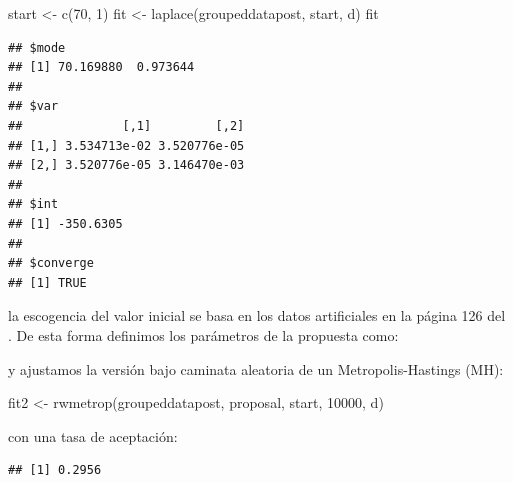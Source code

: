 \documentclass[
  12pt,
]{book}
\newenvironment{Shaded}{\begin{snugshade}}{\end{snugshade}}
\newcommand{\AttributeTok}[1]{\textcolor[rgb]{0.77,0.63,0.00}{#1}}
\newcommand{\DecValTok}[1]{\textcolor[rgb]{0.00,0.00,0.81}{#1}}
\newcommand{\FunctionTok}[1]{\textcolor[rgb]{0.00,0.00,0.00}{#1}}
\newcommand{\NormalTok}[1]{#1}
\newcommand{\OtherTok}[1]{\textcolor[rgb]{0.56,0.35,0.01}{#1}}
\newcommand{\SpecialCharTok}[1]{\textcolor[rgb]{0.00,0.00,0.00}{#1}}
\theoremstyle{definition}
\theoremstyle{definition}
\theoremstyle{definition}
\theoremstyle{definition}
\theoremstyle{remark}
\begin{document}
\begin{Shaded}
\begin{Highlighting}[]
\NormalTok{start }\OtherTok{\textless{}{-}} \FunctionTok{c}\NormalTok{(}\DecValTok{70}\NormalTok{, }\DecValTok{1}\NormalTok{)}
\NormalTok{fit }\OtherTok{\textless{}{-}} \FunctionTok{laplace}\NormalTok{(groupeddatapost, start, d)}
\NormalTok{fit}
\end{Highlighting}
\end{Shaded}

\begin{verbatim}
## $mode
## [1] 70.169880  0.973644
## 
## $var
##              [,1]         [,2]
## [1,] 3.534713e-02 3.520776e-05
## [2,] 3.520776e-05 3.146470e-03
## 
## $int
## [1] -350.6305
## 
## $converge
## [1] TRUE
\end{verbatim}

la escogencia del valor inicial se basa en los datos artificiales en la página 126 del \autocite{Albert2009}. De esta forma definimos los parámetros de la propuesta como:

\begin{Shaded}
\end{Shaded}

y ajustamos la versión bajo caminata aleatoria de un Metropolis-Hastings (MH):

\begin{Shaded}
\begin{Highlighting}[]
\NormalTok{fit2 }\OtherTok{\textless{}{-}} \FunctionTok{rwmetrop}\NormalTok{(groupeddatapost, proposal, start,}
    \DecValTok{10000}\NormalTok{, d)}
\end{Highlighting}
\end{Shaded}

con una tasa de aceptación:

\begin{Shaded}
\end{Shaded}

\begin{verbatim}
## [1] 0.2956
\end{verbatim}
\end{document}
